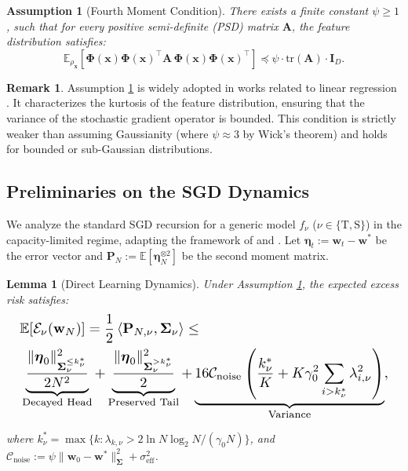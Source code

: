 \documentclass{article}
\theoremstyle{definition}
\theoremstyle{definition}
\newtheorem{remark}{Remark}
\theoremstyle{plain}
\theoremstyle{plain}
\newtheorem{assumption}{Assumption}
\theoremstyle{plain}
\newtheorem{lemma}{Lemma}
\theoremstyle{plain}
\theoremstyle{plain}
\newcommand{\bs}[1]{\boldsymbol{\mathbf{#1}}}
\newcommand{\Ex}{\mathbb{E}}
\newcommand{\tr}{\mathrm{tr}}
\newcommand{\vecx}{\mathbf{x}}
\newcommand{\te}{\mathrm{T}}
\newcommand{\st}{\mathrm{S}}
\newcommand{\eff}{\mathrm{eff}}
\newcommand{\Sig}{\mathbf{\Sigma}}
\newcommand{\w}{\mathbf{w}}
\newcommand{\inner}[1]{\left\langle#1\right\rangle}
\begin{document}
\begin{assumption}[Fourth Moment Condition]\label{assump:fourthmoment}
    There exists a finite constant $\psi \geq 1$, such that for every positive semi-definite (PSD) matrix $\bs A$, the feature distribution satisfies:
    \begin{equation}
        \Ex_{ \rho_{\vecx}}\left[ \bs\Phi(\vecx)\bs\Phi(\vecx)^\top \bs A\, \bs\Phi(\vecx)\bs\Phi(\vecx)^\top  \right] \preceq \psi \cdot \tr(\bs A) \cdot \mathbf{I}_D.
    \end{equation}
\end{assumption}

\begin{remark}
    Assumption \ref{assump:fourthmoment} is widely adopted in works related to linear regression  \citep{Bartlett_2020,tsigler2022benignoverfittingridgeregression,zou2021benign,wu2022last}. 
    It characterizes the kurtosis of the feature distribution, ensuring that the variance of the stochastic gradient operator is bounded. 
    This condition is strictly weaker than assuming Gaussianity (where $\psi \approx 3$ by Wick's theorem) and holds for bounded or sub-Gaussian distributions.
\end{remark}


\subsection{Preliminaries on the SGD Dynamics}
\label{subsec:sgd_dynamics}

We analyze the standard SGD recursion for a generic model $f_\nu$ ($\nu \in \{\te, \st\}$) in the capacity-limited regime, adapting the framework of \citet{ge2019step} and \citet{wu2022last}.
Let $\bs\eta_t := \w_t - \w^*$ be the error vector and $\mathbf{P}_N := \Ex[\bs\eta_N^{\otimes 2}]$ be the second moment matrix.

\begin{lemma}[Direct Learning Dynamics]
\label{lem:direct_learning_bound}
Under Assumption \ref{assump:fourthmoment}, the expected excess risk satisfies:
\begin{equation}
\resizebox{\columnwidth}{!}{
    $
    \begin{aligned}
    &\Ex[\mathcal{E}_\nu(\w_{N})] = \frac{1}{2}\inner{\mathbf{P}_{N,\nu},\mathbf{\Sigma_\nu}} \nonumber \leq\\ &\underbrace{\frac{\|\bs\eta_0\|^2_{\Sig^{\leq k^*_\nu}_\nu}}{2N^2}}_{\text{Decayed Head}} + \underbrace{\frac{\|\bs\eta_0\|^2_{\Sig^{>k^*_\nu}_\nu}}{2}}_{\text{Preserved Tail}} \nonumber + \underbrace{16 \mathcal{C}_{\text{noise}} \left( \frac{k^*_\nu}{K} + K\gamma_0^2 \sum_{i > k^*_\nu} \lambda_{i,\nu}^2 \right)}_{\text{Variance}},
\end{aligned}
    $
    }
\end{equation}


\noindent where $k^*_\nu = \max\{k:\lambda_{k,\nu}> 2\ln N\log_2 N/ (\gamma_0 N) \}$, and $\mathcal{C}_{\text{noise}} := \psi\|\w_{0}-\w^*\|^2_{\bs\Sigma}+\sigma_\eff^2$. 
\end{lemma}
\end{document}
